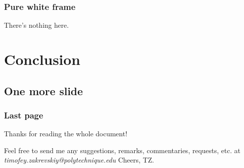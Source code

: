 \documentclass{beamer}
\begin{document}
{%
\begin{frame}
\frametitle{Pure white frame}

There's nothing here.

\end{frame}
}

\section{Conclusion}
\subsection{One more slide}
\begin{frame}
\frametitle{Last page}
Thanks for reading the whole document!

Feel free to send me any suggestions, remarks, commentaries, requests, etc. at \textit{{\color{Xblue}timofey.zakrevskiy@polytechnique.edu}}
\vfill
Cheers, TZ.
\end{frame}
\end{document}
